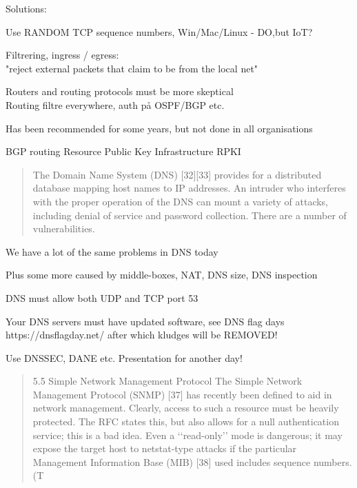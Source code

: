 \documentclass[Screen16to9,17pt]{foils}
\begin{document}

\begin{list1}
\item Solutions:
\begin{list2}
\item Use RANDOM TCP sequence numbers, Win/Mac/Linux - DO,but IoT?
\item Filtrering, ingress / egress:\\
"reject external packets that claim to be from the local net"
\item Routers and routing protocols must be more skeptical\\
Routing filtre everywhere, auth på OSPF/BGP etc.
\end{list2}
\item Has been recommended for some years, but not done in all organisations
\item BGP routing Resource Public Key Infrastructure RPKI
\end{list1}


\begin{quote}
The Domain Name System (DNS) [32][33] provides for a distributed database mapping host names to IP
addresses. An intruder who interferes with the proper operation of the DNS can mount a variety of
attacks, including denial of service and password collection. There are a number of vulnerabilities.
\end{quote}

\begin{list1}
\item We have a lot of the same problems in DNS today
\item Plus some more caused by middle-boxes, NAT, DNS size, DNS inspection
\begin{list2}
\item DNS must allow both UDP and TCP port 53
\item Your DNS servers must have updated software, see DNS flag days\\ https://dnsflagday.net/ after which kludges will be REMOVED!
\item Use DNSSEC, DANE etc. Presentation for another day!
\end{list2}
\end{list1}


\begin{quote}
5.5 Simple Network Management Protocol
The Simple Network Management Protocol (SNMP) [37] has recently been defined to aid in network
management. Clearly, access to such a resource must be heavily protected. The RFC states this, but
also allows for a null authentication service; this is a bad idea. Even a ‘‘read-only’’ mode is dangerous;
it may expose the target host to netstat-type attacks if the particular Management Information Base
(MIB) [38] used includes sequence numbers. (T
\end{quote}
\end{document}
